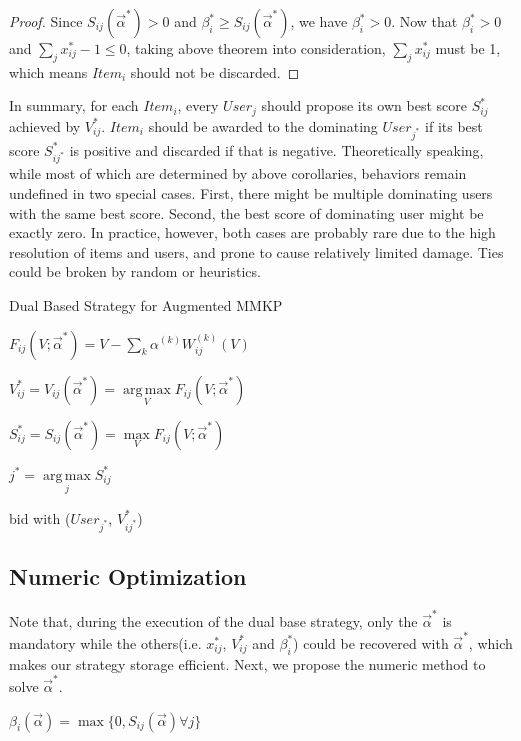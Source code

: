 \documentclass[sigconf]{acmart}
\DeclareMathOperator*{\argmax}{arg\,max}
\newcommand{\sumk}{\sum\limits_k}
\newcommand{\sx}{x_{ij}}
\newcommand{\sV}{V_{ij}}
\newcommand{\sW}{W_{ij}^{(k)}}
\newcommand{\salpha}{\alpha^{(k)}}
\newcommand{\sbeta}{\beta_i}
\newcommand{\sF}{F_{ij}}
\newcommand{\sS}{S_{ij}}
\newcommand{\valpha}{\vec{\alpha}}
\begin{document}
\begin{proof}
Since $\sS(\valpha^*) > 0$ and $\sbeta^* \ge \sS(\valpha^*)$, we have $\sbeta^* > 0$.
Now that $\sbeta^* > 0$ and $\sum\limits_j \sx^* - 1 \le 0$,
    taking above theorem into consideration, $\sum\limits_j \sx^*$ must be 1,
    which means $Item_i$ should not be discarded.
\end{proof}

In summary, for each $Item_i$, every $User_j$ should propose its own best score $\sS^*$ achieved by $\sV^*$.
$Item_i$ should be awarded to the dominating $User_{j^*}$ if its best score $S_{ij^*}^*$ is positive and discarded if that is negative.
Theoretically speaking, while most of which are determined by above corollaries, behaviors remain undefined in two special cases.
First, there might be multiple dominating users with the same best score.
Second, the best score of dominating user might be exactly zero.
In practice, however, both cases are probably rare due to the high resolution of items and users, and prone to cause relatively limited damage.
Ties could be broken by random or heuristics.

\begin{algorithm}
\caption{Dual Based Strategy for Augmented MMKP}

{
  {
    $\sF(V; \valpha^*) = V - \sumk \salpha \sW(V)$

    $\sV^* = \sV(\valpha^*) = \argmax\limits_V \sF(V; \valpha^*)$

    $\sS^* = \sS(\valpha^*) = \max\limits_V \sF(V; \valpha^*)$
  }
  $j^* = \argmax\limits_j \sS^*$
  
   { bid with ($User_{j^*}$, $V_{ij^*}^*$) }
}
\end{algorithm}

\subsection{Numeric Optimization}

Note that, during the execution of the dual base strategy,
    only the $\valpha^*$ is mandatory while the others(i.e. $\sx^*$, $\sV^*$ and $\sbeta^*$) could be recovered with $\valpha^*$,
    which makes our strategy storage efficient.
Next, we propose the numeric method to solve $\valpha^*$.

\begin{definition}
$\sbeta(\valpha) = \max \{ 0, \sS(\valpha) \forall j \}$
\end{definition}
\end{document}
